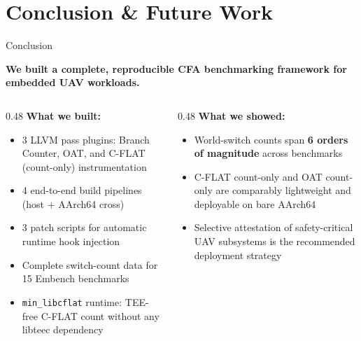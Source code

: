 \documentclass[aspectratio=169, 10pt]{beamer}
\begin{document}
\section{Conclusion \& Future Work}

\begin{frame}{Conclusion}
    \begin{center}
        \large\textbf{We built a complete, reproducible CFA benchmarking
        framework for embedded UAV workloads.}
    \end{center}
    \vspace{8pt}
    \begin{columns}[T]
        \begin{column}{0.48\textwidth}
            \textbf{What we built:}
            \begin{itemize}
                \item 3 LLVM pass plugins: Branch Counter, OAT, and C-FLAT (count-only) instrumentation
                \item 4 end-to-end build pipelines (host + AArch64 cross)
                \item 3 patch scripts for automatic runtime hook injection
                \item Complete switch-count data for 15 Embench benchmarks
                \item \texttt{min\_libcflat} runtime: TEE-free C-FLAT count without any libteec dependency
            \end{itemize}
        \end{column}
        \begin{column}{0.48\textwidth}
            \textbf{What we showed:}
            \begin{itemize}
                \item World-switch counts span \textbf{6 orders of magnitude}
                      across benchmarks
                \item C-FLAT count-only and OAT count-only are comparably
                      lightweight and deployable on bare AArch64
                \item Selective attestation of safety-critical UAV subsystems
                      is the recommended deployment strategy
            \end{itemize}
        \end{column}
    \end{columns}
\end{frame}
\end{document}
